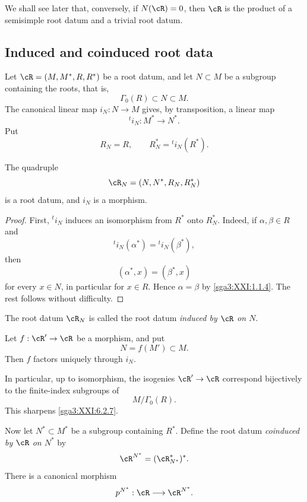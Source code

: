 We shall see later that, conversely, if \(N(\cR)=0\), then \(\cR\) is
the product of a semisimple root datum and a trivial root datum.


\subsection{Induced and coinduced root data}\label{sga3:XXI:6.5}

Let \(\cR=(M,M^\ast,R,R^\ast)\) be a root datum, and let
\(N\subset M\) be a subgroup containing the roots, that is,
\[
 \Gamma_0(R)\subset N\subset M.
\]
The canonical linear map \(i_N:N\to M\) gives, by transposition, a
linear map
\[
 {}^ti_N:M^\ast\longrightarrow N^\ast.
\]
Put
\[
 R_N=R,
 \qquad
 R_N^\ast={}^ti_N(R^\ast).
\]

\begin{lemma}\label{sga3:XXI:6.5.1}
The quadruple
\[
 \cR_N=(N,N^\ast,R_N,R_N^\ast)
\]
is a root datum, and \(i_N\) is a morphism.
\end{lemma}

\begin{proof}
First, \({}^ti_N\) induces an isomorphism from \(R^\ast\) onto
\(R_N^\ast\). Indeed, if \(\alpha,\beta\in R\) and
\[
 {}^ti_N(\alpha^\ast)={}^ti_N(\beta^\ast),
\]
then
\[
 (\alpha^\ast,x)=(\beta^\ast,x)
\]
for every \(x\in N\), in particular for \(x\in R\). Hence
\(\alpha=\beta\) by \ref{sga3:XXI:1.1.4}. The rest follows without
difficulty.
\end{proof}

\begin{definition}\label{sga3:XXI:6.5.2}
The root datum \(\cR_N\) is called the root datum
\emph{induced by \(\cR\) on \(N\)}.
\end{definition}

\begin{lemma}\label{sga3:XXI:6.5.3}
Let \(f:\cR'\to\cR\) be a morphism, and put
\[
 N=f(M')\subset M.
\]
Then \(f\) factors uniquely through \(i_N\).
\end{lemma}

In particular, up to isomorphism, the isogenies
\(\cR'\to\cR\) correspond bijectively to the finite-index subgroups of
\[
 M/\Gamma_0(R).
\]
This sharpens \ref{sga3:XXI:6.2.7}.

Now let \(N^\ast\subset M^\ast\) be a subgroup containing \(R^\ast\).
Define the root datum \emph{coinduced by \(\cR\) on \(N^\ast\)} by
\[
 \cR^{N^\ast}=(\cR^\ast_{N^\ast})^\ast.
\]
There is a canonical morphism
\[
 p^{N^\ast}:\cR\longrightarrow\cR^{N^\ast}.
\]

